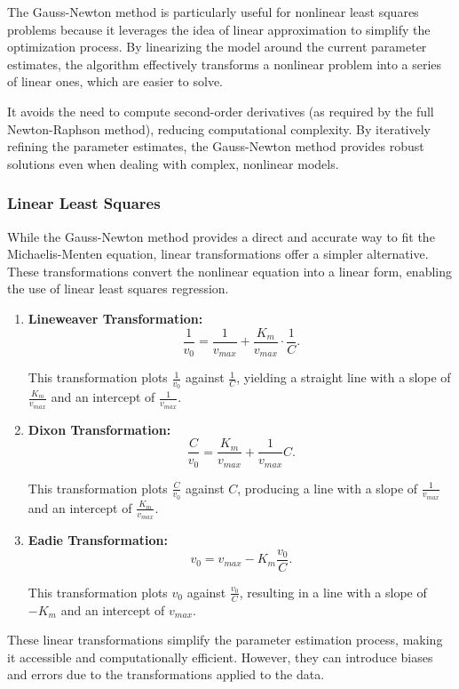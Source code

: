 \documentclass{article} %
\theoremstyle{definition}
\theoremstyle{remark}
\theoremstyle{plain}
\begin{document}
The Gauss-Newton method is particularly useful for nonlinear least squares problems because it leverages the idea of linear approximation to simplify the optimization process. By linearizing the model around the current parameter estimates, the algorithm effectively transforms a nonlinear problem into a series of linear ones, which are easier to solve.

It avoids the need to compute second-order derivatives (as required by the full Newton-Raphson method), reducing computational complexity.
By iteratively refining the parameter estimates, the Gauss-Newton method provides robust solutions even when dealing with complex, nonlinear models.


\subsubsection{Linear Least Squares}
While the Gauss-Newton method provides a direct and accurate way to fit the Michaelis-Menten equation, linear transformations offer a simpler alternative. These transformations convert the nonlinear equation into a linear form, enabling the use of linear least squares regression.

\begin{enumerate}
    \item \textbf{Lineweaver Transformation:}
    \[
       \frac{1}{v_0} = \frac{1}{v_{max}} + \frac{K_m}{v_{max}} \cdot \frac{1}{C}.
    \]
    
       This transformation plots \(\frac{1}{v_0}\) against \(\frac{1}{C}\), yielding a straight line with a slope of \(\frac{K_m}{v_{max}}\) and an intercept of \(\frac{1}{v_{max}}\).

    \item \textbf{Dixon Transformation:}
   \[
   \frac{C}{v_0} = \frac{K_m}{v_{max}} + \frac{1}{v_{max}} C.
   \]

   This transformation plots \(\frac{C}{v_0}\) against \(C\), producing a line with a slope of \(\frac{1}{v_{max}}\) and an intercept of \(\frac{K_m}{v_{max}}\).
   \item  \textbf{Eadie Transformation:}
       \[
   v_0 = v_{max} - K_m \frac{v_0}{C}.
   \]

   This transformation plots \(v_0\) against \(\frac{v_0}{C}\), resulting in a line with a slope of \(-K_m\) and an intercept of \(v_{max}\).
\end{enumerate}


These linear transformations simplify the parameter estimation process, making it accessible and computationally efficient. However, they can introduce biases and errors due to the transformations applied to the data. 
\end{document}
